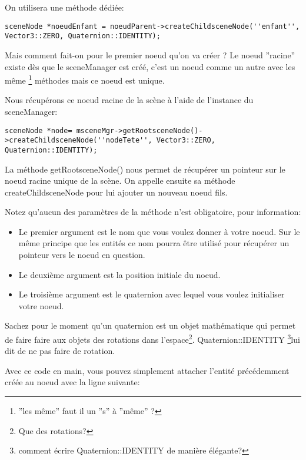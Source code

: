\documentclass[10pt,a4paper]{report}
\begin{document}
On utilisera une m\'ethode d\'edi\'ee:

\begin{lstlisting}
sceneNode *noeudEnfant = noeudParent->createChildsceneNode(''enfant'', Vector3::ZERO, Quaternion::IDENTITY);
\end{lstlisting}


Mais comment fait-on pour le premier noeud qu'on va cr\'eer ? Le noeud ''racine'' existe d\`es que le sceneManager est cr\'e\'e, c'est un noeud comme un autre avec les m\^eme \footnote{''les m\^eme'' faut il un ''s'' \`{a} ''m\^eme'' ?} m\'ethodes mais ce noeud est unique.\newline

Nous r\'ecup\'erons ce noeud racine de la sc\`ene  \`{a} l'aide de l'instance du sceneManager:
\begin{lstlisting}
sceneNode *node= msceneMgr->getRootsceneNode()->createChildsceneNode(''nodeTete'', Vector3::ZERO, Quaternion::IDENTITY);
\end{lstlisting}

La m\'ethode getRootsceneNode() nous permet de r\'ecup\'erer un pointeur sur le noeud racine unique de la sc\`ene. On appelle ensuite sa m\'ethode createChildsceneNode pour lui ajouter un nouveau noeud fils.

Notez qu'aucun des param\`etres de la m\'ethode n'est obligatoire, pour information:
\begin{itemize}
\item Le premier argument est le nom que vous voulez donner \`{a} votre noeud. Sur le m\^eme principe que les entit\'es ce nom pourra \^etre utilis\'e pour r\'ecup\'erer un pointeur vers le noeud en question. 
\item Le deuxi\`eme argument est la position initiale du noeud.
\item Le troisi\`eme argument est le quaternion avec lequel vous voulez initialiser votre noeud.
\end{itemize}
	

Sachez pour le moment qu'un quaternion est un objet math\'ematique qui permet de faire faire aux objets des rotations dans l'espace\footnote{Que des rotations?}. Quaternion::IDENTITY \footnote{comment \'ecrire Quaternion::IDENTITY de manière élégante?}lui dit de ne pas faire de rotation.\newline

Avec ce code en main, vous pouvez simplement attacher l'entit\'e pr\'ec\'edemment cr\'e\'ee au noeud avec la ligne suivante:
\end{document}
